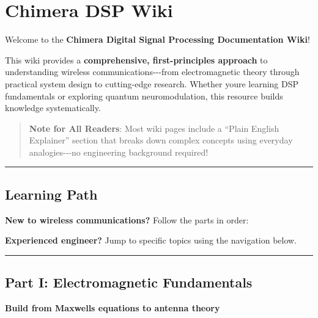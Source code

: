 \section{Chimera DSP Wiki}\label{chimera-dsp-wiki}

Welcome to the \textbf{Chimera Digital Signal Processing Documentation
Wiki}!

This wiki provides a \textbf{comprehensive, first-principles approach}
to understanding wireless communications-\/-\/-from electromagnetic
theory through practical system design to cutting-edge research. Whether
you\textquotesingle re learning DSP fundamentals or exploring quantum
neuromodulation, this resource builds knowledge systematically.

\begin{quote}
\textbf{Note for All Readers}: Most wiki pages include a ``Plain English
Explainer'' section that breaks down complex concepts using everyday
analogies-\/-\/-no engineering background required!
\end{quote}

\begin{center}\rule{0.5\linewidth}{0.5pt}\end{center}

\subsection{\texorpdfstring{ Learning
Path}{ Learning Path}}\label{learning-path}

\textbf{New to wireless communications?} Follow the parts in order:

\textbf{Experienced engineer?} Jump to specific topics using the
navigation below.

\begin{center}\rule{0.5\linewidth}{0.5pt}\end{center}

\subsection{\texorpdfstring{ Part I: Electromagnetic
Fundamentals}{ Part I: Electromagnetic Fundamentals}}\label{part-i-electromagnetic-fundamentals}

\textbf{Build from Maxwell\textquotesingle s equations to antenna
theory}

